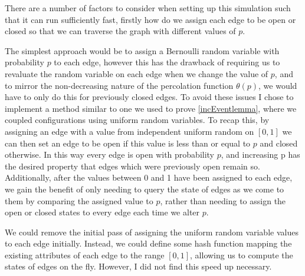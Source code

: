 \documentclass[a4paper,11pt]{article}
\theoremstyle{definition}
\begin{document}
There are a number of factors to consider when setting up this simulation such that it can run sufficiently fast, firstly how do we assign each edge to be open or closed so that we can traverse the graph with different values of $p$.

The simplest approach would be to assign a Bernoulli random variable with probability $p$ to each edge, however this has the drawback of requiring us to revaluate the random variable on each edge when we change the value of $p$, and to mirror the non-decreasing nature of the percolation function $\theta(p)$, we would have to only do this for previously closed edges. To avoid these issues I chose to implement a method similar to one we used to prove \ref{incEventlemma}, where we coupled configurations using uniform random variables. To recap this, by assigning an edge with a value from independent uniform random on $[0,1]$ we can then set an edge to be open if this value is less than or equal to $p$ and closed otherwise. In this way every edge is open with probability $p$, and increasing p has the desired property that edges which were previously open remain so. Additionally, after the values between 0 and 1 have been assigned to each edge, we gain the benefit of only needing to query the state of edges as we come to them by comparing the assigned value to $p$, rather than needing to assign the open or closed states to every edge each time we alter $p$.

We could remove the initial pass of assigning the uniform random variable values to each edge initially. Instead, we could define some hash function mapping the existing attributes of each edge to the range $[0,1]$, allowing us to compute the states of edges on the fly. However, I did not find this speed up necessary.
\end{document}

